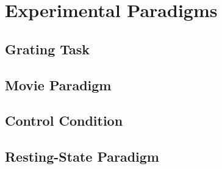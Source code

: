 \section{Experimental Paradigms}
\label{sec:experimental_paradigms}

\subsection{Grating Task}



\subsection{Movie Paradigm}



\subsection{Control Condition}



\subsection{Resting-State Paradigm}


